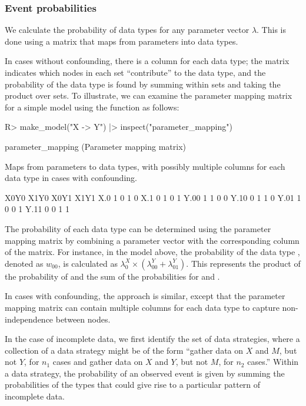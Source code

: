 \documentclass[
  11pt,
  article]{jss}
\renewcommand{\texttt}[1]{\code{#1}}
\begin{document}
\subsubsection{Event probabilities}\label{event-probabilities}

We calculate the probability of data types for any parameter vector
\(\lambda\). This is done using a matrix that maps from parameters into
data types.

In cases without confounding, there is a column for each data type; the
matrix indicates which nodes in each set ``contribute'' to the data
type, and the probability of the data type is found by summing within
sets and taking the product over sets. To illustrate, we can examine the
parameter mapping matrix for a simple model using the \texttt{inspect()}
function as follows:

\begin{CodeChunk}
\begin{CodeInput}
R> make_model("X -> Y") |> inspect("parameter_mapping") 
\end{CodeInput}

\begin{CodeOutput}

parameter_mapping (Parameter mapping matrix) 

  Maps from parameters to data types, with
  possibly multiple columns for each data type
  in cases with confounding. 

     X0Y0 X1Y0 X0Y1 X1Y1
X.0     1    0    1    0
X.1     0    1    0    1
Y.00    1    1    0    0
Y.10    0    1    1    0
Y.01    1    0    0    1
Y.11    0    0    1    1
\end{CodeOutput}
\end{CodeChunk}

The probability of each data type can be determined using the parameter
mapping matrix by combining a parameter vector with the corresponding
column of the matrix. For instance, in the model above, the probability
of the data type \texttt{X0Y0}, denoted as \(w_{00}\), is calculated as
\(\lambda^X_0 \times (\lambda^Y_{00} + \lambda^Y_{01})\). This
represents the product of the probability of \texttt{X.0} and the sum of
the probabilities for \texttt{Y.00} and \texttt{Y.01}.

In cases with confounding, the approach is similar, except that the
parameter mapping matrix can contain multiple columns for each data type
to capture non-independence between nodes.

In the case of incomplete data, we first identify the set of data
strategies, where a collection of a data strategy might be of the form
``gather data on \(X\) and \(M\), but not \(Y\), for \(n_1\) cases and
gather data on \(X\) and \(Y\), but not \(M\), for \(n_2\) cases.''
Within a data strategy, the probability of an observed event is given by
summing the probabilities of the types that could give rise to a
particular pattern of incomplete data.
\end{document}
